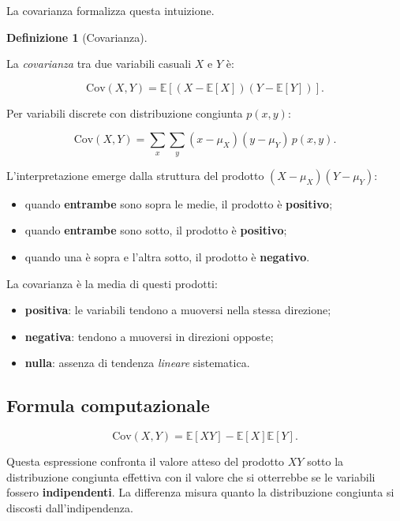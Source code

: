 \documentclass[
  italian,
  letterpaper,
  a4paper,
  11pt,
  open=any]{scrbook}
\providecommand{\tightlist}{%
  \setlength{\itemsep}{0pt}\setlength{\parskip}{0pt}}
\theoremstyle{plain}
\theoremstyle{definition}
\theoremstyle{definition}
\newtheorem{definition}{Definizione}[chapter]
\theoremstyle{remark}
\begin{document}
La covarianza formalizza questa intuizione.

\begin{definition}[Covarianza]\protect\hypertarget{def-covariance}{}\label{def-covariance}

La \emph{covarianza} tra due variabili casuali \(X\) e \(Y\) è:

\[
\text{Cov}(X, Y) = \mathbb{E}\left[(X - \mathbb{E}[X])(Y - \mathbb{E}[Y])\right].
\]

Per variabili discrete con distribuzione congiunta \(p(x,y)\):

\[
\text{Cov}(X, Y) = \sum_{x}\sum_{y}(x - \mu_X)(y - \mu_Y)\,p(x, y).
\]

\end{definition}

L'interpretazione emerge dalla struttura del prodotto
\((X - \mu_X)(Y - \mu_Y)\):

\begin{itemize}
\tightlist
\item
  quando \textbf{entrambe} sono sopra le medie, il prodotto è
  \textbf{positivo};
\item
  quando \textbf{entrambe} sono sotto, il prodotto è \textbf{positivo};
\item
  quando una è sopra e l'altra sotto, il prodotto è \textbf{negativo}.
\end{itemize}

La covarianza è la media di questi prodotti:

\begin{itemize}
\tightlist
\item
  \textbf{positiva}: le variabili tendono a muoversi nella stessa
  direzione;
\item
  \textbf{negativa}: tendono a muoversi in direzioni opposte;
\item
  \textbf{nulla}: assenza di tendenza \emph{lineare} sistematica.
\end{itemize}

\subsection{Formula computazionale}\label{formula-computazionale}

\[
\text{Cov}(X, Y) = \mathbb{E}[XY] - \mathbb{E}[X]\mathbb{E}[Y].
\]

Questa espressione confronta il valore atteso del prodotto \(XY\) sotto
la distribuzione congiunta effettiva con il valore che si otterrebbe se
le variabili fossero \textbf{indipendenti}. La differenza misura quanto
la distribuzione congiunta si discosti dall'indipendenza.
\end{document}
